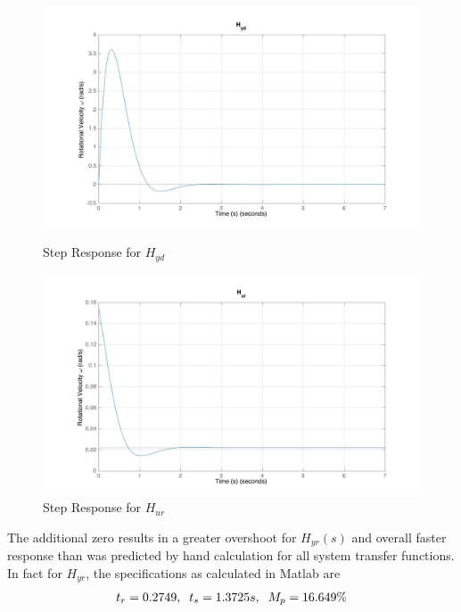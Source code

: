 \documentclass[11pt,titlepage]{article}
\begin{document}
    \begin{figure}[H]
        \centering
        \begin{minipage}{.5\textwidth}
            \centering
            \includegraphics[scale=.18]{Hyd_step1_mat}
            \caption{Step Response for $H_{yd}$}
            \label{fig:Hyd_step1_mat}
        \end{minipage}%
        \begin{minipage}{.5\textwidth}
            \centering
            \includegraphics[scale=.18]{Hur_step1_mat}
            \caption{Step Response for $H_{ur}$}
            \label{fig:Hur_step1_mat}
        \end{minipage}%
    \end{figure}

	
	The additional zero results in a greater overshoot for $H_{yr}(s)$ and overall faster response than was predicted by hand calculation for all system transfer functions. In fact for $H_{yr}$, the specifications as calculated in Matlab are 
	\begin{align*}
		t_r = 0.2749,\hspace{0.2cm} t_s=1.3725 s, \hspace{0.2cm} M_p=16.649\%
	\end{align*}
	
\end{document}
